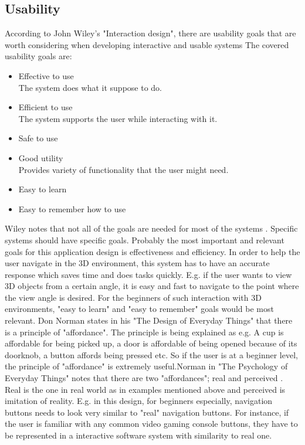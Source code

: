 \subsection{Usability}
\label{Usability}

According to John Wiley's "Interaction design", there are usability goals that are worth considering when developing interactive and usable systems \cite{Wileys} The covered usability goals are:

\begin{itemize}
\item Effective to use\\
The system does what it suppose to do.
\item Efficient to use\\
The system supports the user while interacting	
with it.
\item Safe to use
\item Good utility \\
Provides variety of functionality that the user might need.
\item Easy to learn
\item Easy to remember how to use
\end{itemize}


Wiley notes that not all of the goals are needed for most of the systems \cite{Wileys}. Specific systems should have specific goals. Probably the most important and relevant goals for this application design is effectiveness and efficiency. In order to help the user navigate in the 3D environment, this system has to have an accurate response which saves time and does tasks quickly. E.g. if the user wants to view 3D objects from a certain angle, it is easy and fast to navigate to the point where the view angle is desired. For the beginners of such interaction with 3D environments, "easy to learn" and "easy to remember" goals would be most relevant. Don Norman states in his "The Design of Everyday Things" that there is a principle of "affordance". \cite{Normans} The principle is being explained as e.g. A cup is affordable for being picked up, a door is affordable of being opened because of its doorknob, a button affords being pressed etc. So if the user is at a beginner level, the principle of "affordance" is extremely useful.Norman in "The Psychology of Everyday Things" notes that there are two "affordances"; real and perceived \cite{Affordance}. Real is the one in real world as in examples mentioned above and perceived is imitation of reality. E.g. in this design, for beginners especially, navigation buttons needs to look very similar to "real" navigation buttons. For instance, if the user is familiar with any common video gaming console buttons, they have to be represented in a interactive software system with similarity to real one. 


